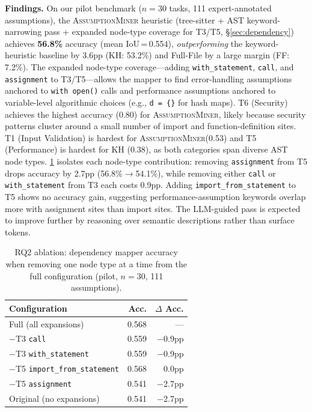 \documentclass[sigconf,review,anonymous]{acmart}
\newcommand{\sysname}{\textsc{AssumptionMiner}\xspace}
\begin{document}
\textbf{Findings.}
On our pilot benchmark ($n=30$ tasks, 111 expert-annotated assumptions), the
\sysname heuristic (tree-sitter + AST keyword-narrowing pass + expanded
node-type coverage for T3/T5, §\ref{sec:dependency}) achieves \textbf{56.8\%}
accuracy (mean IoU\,=\,0.554), \emph{outperforming} the keyword-heuristic
baseline by 3.6pp (KH: 53.2\%) and Full-File by a large margin (FF: 7.2\%).
The expanded node-type coverage—adding \texttt{with\_statement}, \texttt{call},
and \texttt{assignment} to T3/T5—allows the mapper to find error-handling
assumptions anchored to \texttt{with open()} calls and performance assumptions
anchored to variable-level algorithmic choices (e.g., \texttt{d = \{\}} for hash maps).
T6 (Security) achieves the highest accuracy (0.80) for \sysname, likely because
security patterns cluster around a small number of import and function-definition sites.
T1 (Input Validation) is hardest for \sysname (0.53) and T5 (Performance) is hardest
for KH (0.38), as both categories span diverse AST node types.
\cref{tab:ablation} isolates each node-type contribution:
removing \texttt{assignment} from T5 drops accuracy by 2.7pp (56.8\%$\to$54.1\%),
while removing either \texttt{call} or \texttt{with\_statement} from T3 each costs 0.9pp.
Adding \texttt{import\_from\_statement} to T5 shows no accuracy gain, suggesting
performance-assumption keywords overlap more with assignment sites than import sites.
The LLM-guided pass is expected to improve further by reasoning over
semantic descriptions rather than surface tokens.

\begin{table}[t]
\caption{RQ2 ablation: dependency mapper accuracy when removing one node type
         at a time from the full configuration (pilot, $n=30$, 111 assumptions).}
\label{tab:ablation}
\small
\begin{tabular}{@{}lrr@{}}
\toprule
\textbf{Configuration} & \textbf{Acc.} & \textbf{$\Delta$ Acc.} \\
\midrule
Full (all expansions)                       & 0.568 & — \\
\quad$-$T3 \texttt{call}                   & 0.559 & $-$0.9pp \\
\quad$-$T3 \texttt{with\_statement}        & 0.559 & $-$0.9pp \\
\quad$-$T5 \texttt{import\_from\_statement}& 0.568 & 0.0pp \\
\quad$-$T5 \texttt{assignment}             & 0.541 & $-$2.7pp \\
Original (no expansions)                    & 0.541 & $-$2.7pp \\
\bottomrule
\end{tabular}
\end{table}
\end{document}

